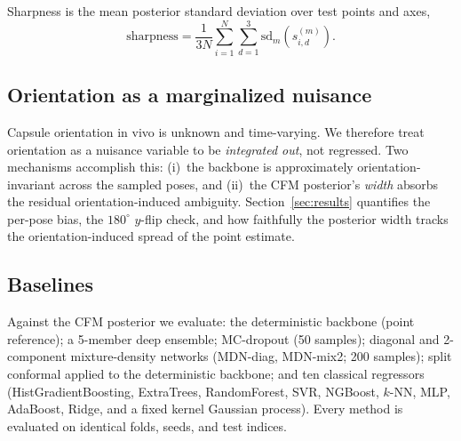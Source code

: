 Sharpness is the mean posterior standard deviation over test points and axes,
\begin{equation}
\mathrm{sharpness}=\frac{1}{3N}\sum_{i=1}^{N}\sum_{d=1}^{3}
\mathrm{sd}_{m}\!\left(s_{i,d}^{(m)}\right).
\label{eq:sharpness}
\end{equation}

\subsection{Orientation as a marginalized nuisance}
Capsule orientation in vivo is unknown and time-varying. We therefore treat
orientation as a nuisance variable to be \emph{integrated out}, not regressed.
Two mechanisms accomplish this: (i)~the backbone is approximately
orientation-invariant across the sampled poses, and (ii)~the CFM posterior's
\emph{width} absorbs the residual orientation-induced ambiguity.
Section~\ref{sec:results} quantifies the per-pose bias, the $180^\circ$
$y$-flip check, and how faithfully the posterior width tracks the
orientation-induced spread of the point estimate.

\subsection{Baselines}
Against the CFM posterior we evaluate: the deterministic backbone (point
reference); a 5-member deep ensemble; MC-dropout (50 samples); diagonal and
2-component mixture-density networks (MDN-diag, MDN-mix2; 200 samples); split
conformal applied to the deterministic backbone; and ten classical regressors
(HistGradientBoosting, ExtraTrees, RandomForest, SVR, NGBoost, $k$-NN, MLP,
AdaBoost, Ridge, and a fixed kernel Gaussian process). Every method is evaluated
on identical folds, seeds, and test indices.
